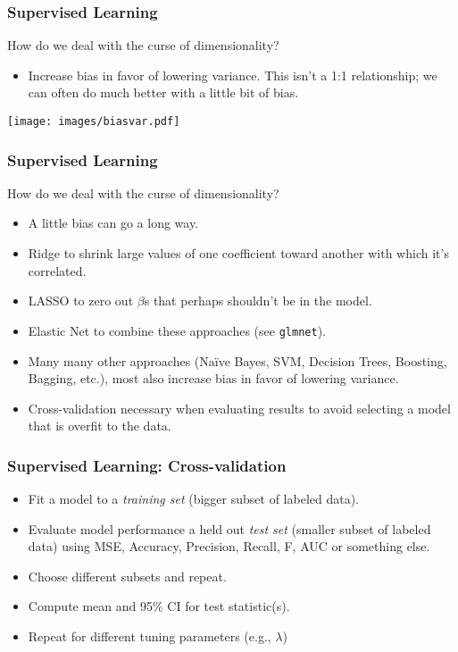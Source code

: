 \documentclass[]{beamer}
\begin{document}
\begin{frame}
  \frametitle{Supervised Learning}   %
   How do we deal with the curse of dimensionality?
  \begin{itemize}
  \item Increase bias in favor of lowering variance.  This isn't a 1:1 relationship; we can often do much better with a little bit of bias. 
  \end{itemize}
  \begin{center}
    \texttt{[image: images/biasvar.pdf]}
  \end{center}
\end{frame}

\begin{frame}
  \frametitle{Supervised Learning}   %
   How do we deal with the curse of dimensionality?
  \begin{itemize}
  \item A little bias can go a long way.
  \item Ridge to shrink large values of one coefficient toward another with which it's correlated.
  \item LASSO to zero out $\beta$s that perhaps shouldn't be in the model.
  \item Elastic Net to combine these approaches (see \texttt{glmnet}).
  \item Many many other approaches (Na\"ive Bayes, SVM, Decision Trees, Boosting, Bagging, etc.), most also increase bias in favor of lowering variance.
  \item Cross-validation necessary when evaluating results to avoid selecting a model that is overfit to the data.
  \end{itemize}
\end{frame}

\begin{frame}
  \frametitle{Supervised Learning: Cross-validation}   %
  \begin{itemize}
  \item Fit a model to a \emph{training set} (bigger subset of labeled data).
  \item Evaluate model performance a held out \emph{test set} (smaller subset of labeled data) using MSE, Accuracy, Precision, Recall, F, AUC or something else.  
  \item Choose different subsets and repeat.
  \item Compute mean and 95\% CI for test statistic(s).
  \item Repeat for different tuning parameters (e.g., $\lambda$)
  \end{itemize}
\end{frame}
\end{document}
